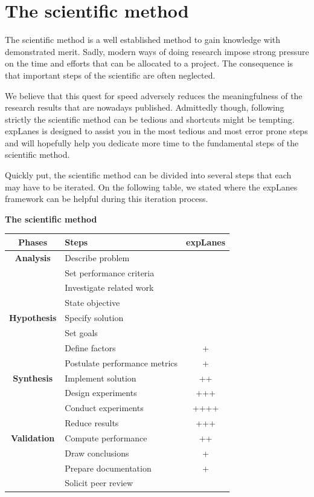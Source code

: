 \documentclass[a4paper,fleqn]{tufte-handout}
\newcommand{\explanes}{\textsf{expLanes} }
\begin{document}
\section{The scientific method}

The scientific method is a well established method to gain knowledge with demonstrated merit. Sadly, modern ways of doing research impose strong pressure on the time and efforts that can be allocated to a project. The consequence is that important steps of the scientific are often neglected. 

We believe that this quest for speed adversely reduces the meaningfulness of the research results that are nowadays published. Admittedly though, following strictly the scientific method can be tedious and shortcuts might be tempting. \explanes is designed to assist you in the most tedious and most error prone steps and will hopefully help you dedicate more time to the fundamental steps of the scientific method.

Quickly put, the scientific method can be divided into several steps that each may have to be iterated. On the following table, we stated where the \explanes framework can be helpful during this iteration process.

\begin{center} \bf The scientific method\cite{right} \end{center}
\begin{tabular}{clc}
\bf Phases & Steps  & \explanes \\
\hline
\bf Analysis & Describe problem & \\
& Set performance criteria & \\
& Investigate related work & \\
& State objective & \\
\bf Hypothesis & Specify solution & \\
& Set goals & \\
& Define factors & + \\
& Postulate performance metrics & + \\
\bf Synthesis & Implement solution & ++ \\
& Design experiments & +++ \\
& Conduct experiments & ++++ \\
& Reduce results & +++ \\
\bf Validation & Compute performance & ++ \\
& Draw conclusions & +\\
& Prepare documentation & + \\
& Solicit peer review & \\
\end{tabular}
\end{document}
